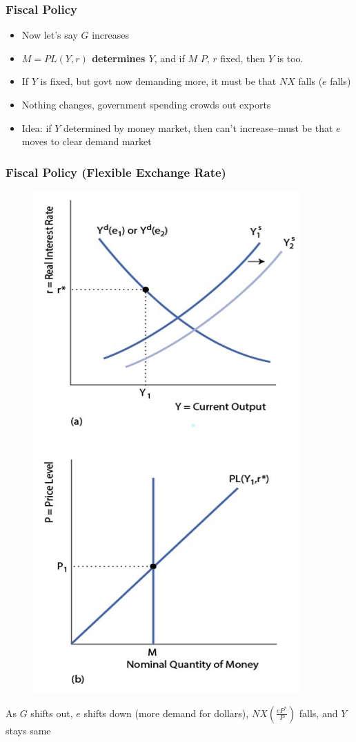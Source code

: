 \documentclass{beamer}
\begin{document}
\begin{frame}
\frametitle[alignment=center]{Fiscal Policy}
\begin{itemize}
\item Now let's say $G$ increases
\bigskip
\item \textbf{$M=PL(Y,r)$ determines $Y$}, and if $M$ $P$, $r$ fixed, then $Y$ is too.
\bigskip
\item If $Y$ is fixed, but govt now demanding more, it must be that $NX$ falls ($e$ falls)
\bigskip
\item Nothing changes, government spending crowds out exports
\bigskip
\item Idea:  if $Y$ determined by money market, then can't increase--must be that $e$ moves to clear demand market
\end{itemize}
\end{frame}

\begin{frame}
\frametitle[alignment=center]{Fiscal Policy (Flexible Exchange Rate)}
\begin{figure}
\centering
\includegraphics[scale=0.55]{Figures/W_Fig_17pt15.png}
\end{figure}
As $G$ shifts out, $e$ shifts down (more demand for dollars), $NX\left(\frac{eP^*}{P}\right)$ falls, and $Y$ stays same
\end{frame}
\end{document}
